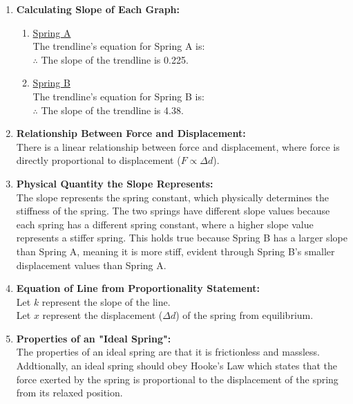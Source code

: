 \documentclass[12pt,letterpaper]{article}
\begin{document}
\begin{enumerate}[font=\bfseries]
	\item \textbf{Calculating Slope of Each Graph:}
	      \vspace{-4mm}
	      \begin{enumerate}
		      \item \underline{Spring A}\\
		            The trendline's equation for Spring A is:~\\
		            $\therefore$ The slope of the trendline is 0.225.
		      \item \underline{Spring B}\\
		            The trendline's equation for Spring B is:~\\
		            $\therefore$ The slope of the trendline is 4.38.
	      \end{enumerate}
	      \newpage
	\item \textbf{Relationship Between Force and Displacement:}\\
	      There is a linear relationship between force and displacement, where force is directly proportional to displacement ($F \propto \Delta d$).
	\item \textbf{Physical Quantity the Slope Represents:}\\
	      The slope represents the spring constant, which physically determines the stiffness of the spring.
	      The two springs have different slope values because each spring has a different spring constant, where a higher slope value represents a stiffer spring.
	      This holds true because Spring B has a larger slope than Spring A, meaning it is more stiff, evident through Spring B's smaller displacement values than Spring A.
	\item \textbf{Equation of Line from Proportionality Statement:}\\
	      Let $k$ represent the slope of the line.\\
	      Let $x$ represent the displacement ($\Delta d$) of the spring from equilibrium.\\
	\item \textbf{Properties of an "Ideal Spring":}\\
	      The properties of an ideal spring are that it is frictionless and massless.
	      Addtionally, an ideal spring should obey Hooke's Law which states that the force exerted by the spring is proportional to the displacement of the spring from its relaxed position.
\end{enumerate}
\end{document}
